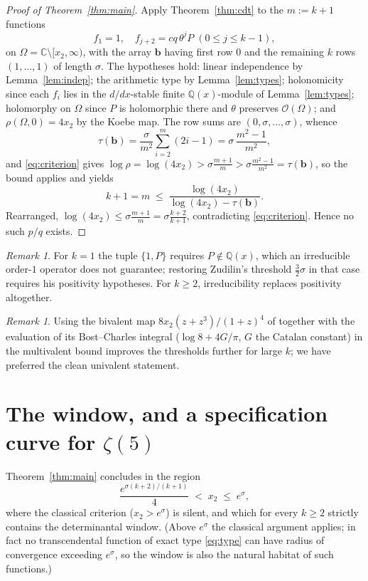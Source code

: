 \documentclass[11pt]{amsart}
\theoremstyle{definition}
\theoremstyle{remark}
\newtheorem{remark}[theorem]{Remark}
\newcommand{\Q}{\mathbb{Q}}
\newcommand{\C}{\mathbb{C}}
\begin{document}
\begin{proof}[Proof of Theorem~\ref{thm:main}]
Apply Theorem~\ref{thm:cdt} to the $m:=k+1$ functions
\[
f_1=1,\quad f_{j+2}=cq\,\theta^jP\;(0\le j\le k-1),
\]
on $\Omega=\C\setminus[x_2,\infty)$, with the array $\mathbf b$ having
first row $0$ and the remaining $k$ rows $(1,\dots,1)$ of length
$\sigma$. The hypotheses hold: linear independence by
Lemma~\ref{lem:indep}; the arithmetic type by Lemma~\ref{lem:types};
holonomicity since each $f_i$ lies in the $d/dx$-stable finite
$\Q(x)$-module of Lemma~\ref{lem:types}; holomorphy on $\Omega$ since
$P$ is holomorphic there and $\theta$ preserves
$\mathcal O(\Omega)$; and $\rho(\Omega,0)=4x_2$ by the Koebe map. The
row sums are $(0,\sigma,\dots,\sigma)$, whence
\[
\tau(\mathbf b)=\frac{\sigma}{m^2}\sum_{i=2}^{m}(2i-1)
=\sigma\,\frac{m^2-1}{m^2},
\]
and \eqref{eq:criterion} gives
$\log\rho=\log(4x_2)>\sigma\frac{m+1}{m}
>\sigma\frac{m^2-1}{m^2}=\tau(\mathbf b)$, so the bound applies and
yields
\[
k+1=m\;\le\;\frac{\log(4x_2)}{\log(4x_2)-\tau(\mathbf b)}.
\]
Rearranged, $\log(4x_2)\le\sigma\frac{m+1}{m}=\sigma\frac{k+2}{k+1}$,
contradicting \eqref{eq:criterion}. Hence no such $p/q$ exists.
\end{proof}

\begin{remark}
For $k=1$ the tuple $\{1,P\}$ requires $P\notin\Q(x)$, which an
irreducible order-$1$ operator does not guarantee; restoring
Zudilin's threshold $\tfrac32\sigma$ in that case requires his
positivity hypotheses. For $k\ge2$, irreducibility replaces positivity
altogether.
\end{remark}

\begin{remark}\label{rem:multivalent}
Using the bivalent map $8x_2(z+z^3)/(1+z)^4$ of
\cite[\S2.11]{CDT} together with the evaluation
\cite[Lemma~2.11.7]{CDT} of its Bost--Charles integral
($\log 8+4G/\pi$, $G$ the Catalan constant) in the multivalent bound
\cite[(2.5.4)]{CDT} improves the thresholds further for large $k$; we
have preferred the clean univalent statement.
\end{remark}

\section{The window, and a specification curve for $\zeta(5)$}
\label{sec:window}

Theorem~\ref{thm:main} concludes in the region
\[
\frac{e^{\sigma(k+2)/(k+1)}}{4}\;<\;x_2\;\le\;e^{\sigma},
\]
where the classical criterion ($x_2>e^{\sigma}$) is silent, and which
for every $k\ge2$ strictly contains the determinantal window. (Above
$e^{\sigma}$ the classical argument applies; in fact no transcendental
function of exact type \eqref{eq:type} can have radius of convergence
exceeding $e^{\sigma}$, so the window is also the natural habitat of
such functions.)
\end{document}
